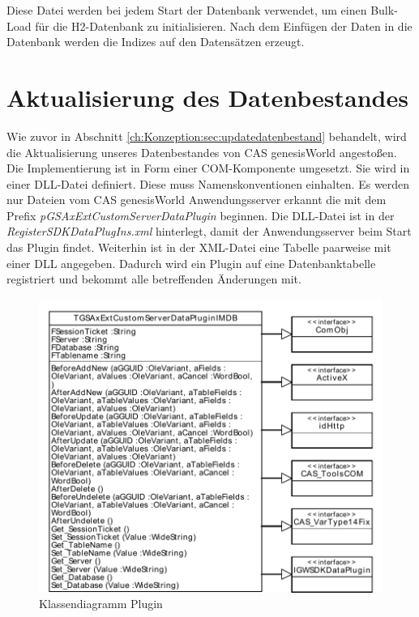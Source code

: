 Diese Datei werden bei jedem Start der Datenbank verwendet, um einen Bulk-Load für die H2-Datenbank zu initialisieren. Nach dem Einfügen der Daten in die Datenbank werden die Indizes auf den Datensätzen erzeugt.


\section{Aktualisierung des Datenbestandes}

Wie zuvor in Abschnitt \ref{ch:Konzeption:sec:updatedatenbestand} behandelt, wird die Aktualisierung unseres Datenbestandes von CAS genesisWorld angestoßen. Die Implementierung ist in Form einer COM-Komponente umgesetzt. Sie wird in einer DLL-Datei definiert. Diese muss Namenskonventionen einhalten. Es werden nur Dateien vom CAS genesisWorld Anwendungsserver erkannt die mit dem Prefix \textit{pGSAxExtCustomServerDataPlugin} beginnen. Die DLL-Datei ist in der \textit{RegisterSDKDataPlugIns.xml} hinterlegt, damit der Anwendungsserver beim Start das Plugin findet. Weiterhin ist in der XML-Datei eine Tabelle paarweise mit einer DLL angegeben. Dadurch wird ein Plugin auf eine Datenbanktabelle registriert und bekommt alle betreffenden Änderungen mit.

\begin{figure}[htbp]
\centering
\includegraphics[scale=0.8]{pics/plugin_klassendiagramm.pdf}
\caption{Klassendiagramm Plugin}
\label{ergebniss_plugin_klassendiagramm}
\end{figure}

